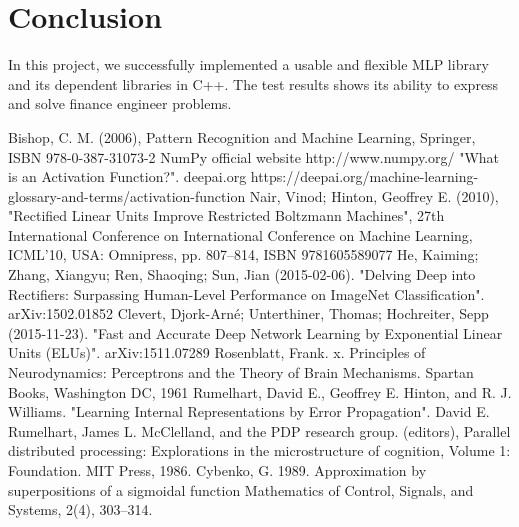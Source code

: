 \documentclass[a4paper]{article}
\begin{document}
\section{Conclusion}
In this project, we successfully implemented a usable and flexible MLP library and its dependent libraries in C++. The test results shows its ability to express and solve finance engineer problems. 








\newpage
\begin{thebibliography}{9}
 Bishop, C. M. (2006), Pattern Recognition and Machine Learning, Springer, ISBN 978-0-387-31073-2
 NumPy official website http://www.numpy.org/
 "What is an Activation Function?". deepai.org https://deepai.org/machine-learning-glossary-and-terms/activation-function
 Nair, Vinod; Hinton, Geoffrey E. (2010), "Rectified Linear Units Improve Restricted Boltzmann Machines", 27th International Conference on International Conference on Machine Learning, ICML'10, USA: Omnipress, pp. 807–814, ISBN 9781605589077
  He, Kaiming; Zhang, Xiangyu; Ren, Shaoqing; Sun, Jian (2015-02-06). "Delving Deep into Rectifiers: Surpassing Human-Level Performance on ImageNet Classification". arXiv:1502.01852 
 Clevert, Djork-Arné; Unterthiner, Thomas; Hochreiter, Sepp (2015-11-23). "Fast and Accurate Deep Network Learning by Exponential Linear Units (ELUs)". arXiv:1511.07289
 Rosenblatt, Frank. x. Principles of Neurodynamics: Perceptrons and the Theory of Brain Mechanisms. Spartan Books, Washington DC, 1961
 Rumelhart, David E., Geoffrey E. Hinton, and R. J. Williams. "Learning Internal Representations by Error Propagation". David E. Rumelhart, James L. McClelland, and the PDP research group. (editors), Parallel distributed processing: Explorations in the microstructure of cognition, Volume 1: Foundation. MIT Press, 1986.
 Cybenko, G. 1989. Approximation by superpositions of a sigmoidal function Mathematics of Control, Signals, and Systems, 2(4), 303–314.
\end{thebibliography}
\end{document}
